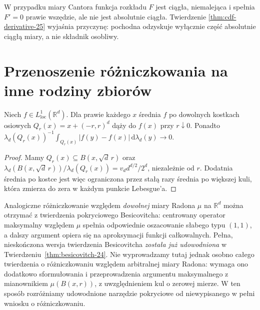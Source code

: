 \begin{przyklad}
W przypadku miary Cantora funkcja rozkładu $F$ jest
ciągła, niemalejąca i spełnia $F'=0$ prawie wszędzie,
ale nie jest absolutnie ciągła. Twierdzenie
\ref{thm:cdf-derivative-25} wyjaśnia przyczynę:
pochodna odzyskuje wyłącznie część absolutnie ciągłą
miary, a nie składnik osobliwy.
\end{przyklad}

\section{Przenoszenie różniczkowania na inne rodziny zbiorów}
\begin{wniosek}
\label{cor:cubes-differentiation-25}
Niech $f\in L^1_{\mathrm{loc}}(\mathbb R^d)$. Dla prawie
każdego $x$ średnia $f$ po dowolnych kostkach osiowych
$Q_r(x)=x+(-r,r)^d$ dąży do $f(x)$ przy $r\downarrow0$.
Ponadto $\lambda_d(Q_r(x))^{-1}
\int_{Q_r(x)}|f(y)-f(x)|\,\mathrm d\lambda_d(y)\to0$.
\end{wniosek}
\begin{proof}
Mamy $Q_r(x)\subseteq B(x,\sqrt d\,r)$ oraz
$\lambda_d(B(x,\sqrt d\,r))/\lambda_d(Q_r(x))
=v_dd^{d/2}/2^d$, niezależnie od $r$. Dodatnia średnia
po kostce jest więc ograniczona przez stałą razy
średnia po większej kuli, która zmierza do zera
w każdym punkcie Lebesgue'a.
\end{proof}

\begin{uwaga}
Analogiczne różniczkowanie względem \emph{dowolnej}
miary Radona $\mu$ na $\mathbb R^d$ można otrzymać
z twierdzenia pokryciowego Besicovitcha:
centrowany operator maksymalny względem $\mu$ spełnia
odpowiednie oszacowanie słabego typu $(1,1)$, a dalszy
argument opiera się na aproksymacji funkcji całkowalnych.
Pełna, nieskończona wersja twierdzenia Besicovitcha
\emph{została już udowodniona} w
Twierdzeniu~\ref{thm:besicovitch-24}.
Nie wyprowadzamy tutaj jednak osobno całego twierdzenia
o różniczkowaniu względem arbitralnej miary Radona:
wymaga ono dodatkowo sformułowania i przeprowadzenia
argumentu maksymalnego z mianownikiem $\mu(B(x,r))$,
z uwzględnieniem kul o zerowej mierze.
W ten sposób rozróżniamy udowodnione narzędzie pokryciowe
od niewypisanego w pełni wniosku o różniczkowaniu.
\end{uwaga}